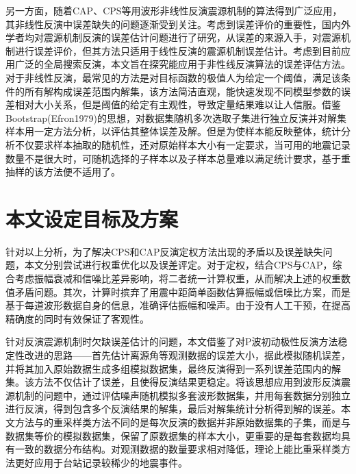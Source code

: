 另一方面，随着CAP、CPS等用波形非线性反演震源机制的算法得到广泛应用\citep{Luo2015,DAmico2014}，其非线性反演中误差缺失的问题逐渐受到关注。考虑到误差评价的重要性，国内外学者均对震源机制反演的误差估计问题进行了研究，\citet{Duputel2012}从误差的来源入手，对震源机制进行误差评价，但其方法只适用于线性反演的震源机制误差估计。考虑到目前应用广泛的全局搜索反演，本文旨在探究能应用于非性线反演算法的误差评估方法。对于非线性反演，最常见的方法是对目标函数的极值人为给定一个阈值，满足该条件的所有解构成误差范围内解集，该方法简洁直观，能快速发现不同模型参数的误差相对大小关系，但是阈值的给定有主观性，导致定量结果难以让人信服。\citet{zhenjianchang2015}借鉴Bootstrap(Efron1979)的思想，对数据集随机多次选取子集进行独立反演并对解集样本用一定方法分析，以评估其整体误差及解。但是为使样本能反映整体，统计分析不仅要求样本抽取的随机性，还对原始样本大小有一定要求，当可用的地震记录数量不是很大时，可随机选择的子样本以及子样本总量难以满足统计要求，基于重抽样的该方法便不适用了。

\section{本文设定目标及方案}

针对以上分析，为了解决CPS和CAP反演定权方法出现的矛盾以及误差缺失问题，本文分别尝试进行权重优化以及误差评定。对于定权，结合CPS与CAP，综合考虑振幅衰减和信噪比差异影响，将二者统一计算权重，从而解决上述的权重数值矛盾问题。其次，计算时摈弃了用震中距简单函数估算振幅或信噪比方案，而是基于每道波形数据自身的信息，准确评估振幅和噪声。由于没有人工干预，在提高精确度的同时有效保证了客观性。

针对反演震源机制时欠缺误差估计的问题，本文借鉴了\citet{Hardebeck2002}对P波初动极性反演方法稳定性改进的思路——首先估计离源角等观测数据的误差大小，据此模拟随机误差，并将其加入原始数据生成多组模拟数据集，最终反演得到一系列误差范围内的解集。该方法不仅估计了误差，且使得反演结果更稳定\citep{Hardebeck2002}。将该思想应用到波形反演震源机制的问题中，通过评估噪声随机模拟多套波形数据集，并用每套数据分别独立进行反演，得到包含多个反演结果的解集，最后对解集统计分析得到解的误差。本文方法与\citet{zhenjianchang2015}的重采样类方法不同的是每次反演的数据并非原始数据集的子集，而是与数据集等价的模拟数据集，保留了原数据集的样本大小，更重要的是每套数据均具有一致的数据分布结构。对观测数据的数量要求相对降低，理论上能比重采样类方法更好应用于台站记录较稀少的地震事件。

